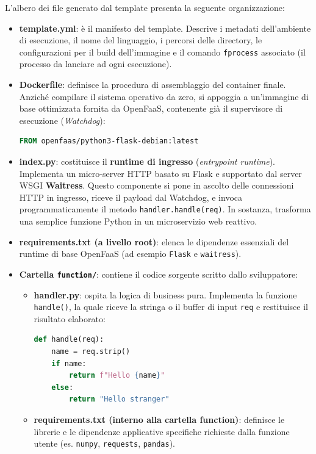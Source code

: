 \documentclass[11pt, a4paper]{article}
\begin{document}
L'albero dei file generato dal template presenta la seguente organizzazione:
\begin{itemize}
    \item \textbf{template.yml}: è il manifesto del template. Descrive i metadati dell'ambiente di esecuzione, il nome del linguaggio, i percorsi delle directory, le configurazioni per il build dell'immagine e il comando \texttt{fprocess} associato (il processo da lanciare ad ogni esecuzione).
    \item \textbf{Dockerfile}: definisce la procedura di assemblaggio del container finale. Anziché compilare il sistema operativo da zero, si appoggia a un'immagine di base ottimizzata fornita da OpenFaaS, contenente già il supervisore di esecuzione (\emph{Watchdog}):
\begin{lstlisting}[language=dockerfile]
FROM openfaas/python3-flask-debian:latest
\end{lstlisting}
    \item \textbf{index.py}: costituisce il \textbf{runtime di ingresso} (\emph{entrypoint runtime}). Implementa un micro-server HTTP basato su Flask e supportato dal server WSGI \textbf{Waitress}. Questo componente si pone in ascolto delle connessioni HTTP in ingresso, riceve il payload dal Watchdog, e invoca programmaticamente il metodo \texttt{handler.handle(req)}. In sostanza, trasforma una semplice funzione Python in un microservizio web reattivo.
    \item \textbf{requirements.txt (a livello root)}: elenca le dipendenze essenziali del runtime di base OpenFaaS (ad esempio \texttt{Flask} e \texttt{waitress}).
    \item \textbf{Cartella \texttt{function/}}: contiene il codice sorgente scritto dallo sviluppatore:
    \begin{itemize}
        \item \textbf{handler.py}: ospita la logica di business pura. Implementa la funzione \texttt{handle()}, la quale riceve la stringa o il buffer di input \texttt{req} e restituisce il risultato elaborato:
\begin{lstlisting}[language=python]
def handle(req):
    name = req.strip()
    if name:
        return f"Hello {name}"
    else:
        return "Hello stranger"
\end{lstlisting}
        \item \textbf{requirements.txt (interno alla cartella function)}: definisce le librerie e le dipendenze applicative specifiche richieste dalla funzione utente (es. \texttt{numpy}, \texttt{requests}, \texttt{pandas}).

\end{itemize}
\end{itemize}
\end{document}
